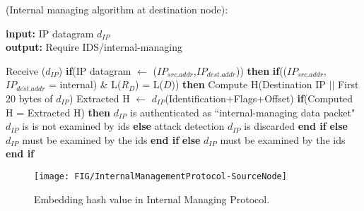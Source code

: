 \documentclass{llncs}
\begin{document}
    \begin{algorithm*}[t]
    \caption{(Internal managing algorithm at destination node):}\label{alg7}
    \hspace*{\algorithmicindent} \textbf{input:}  IP datagram $d_{IP}$ \\
    \hspace*{\algorithmicindent} \textbf{output:}  Require IDS/internal-managing
    \begin{algorithmic}[1]
    \State Receive ($d_{IP}$)
    \State \textbf{if}(IP datagram $\gets$  ($IP_{src.addr}$,$IP_{dest.addr}$)) \textbf{then}
    \State \hspace{10pt} \textbf{if}(($IP_{src.addr}$, $IP_{dest.addr}$ = internal) \& L($R_{D}$) = L($D$)) \textbf{then}
    \State \hspace{20pt} Compute H(Destination IP $||$ First 20 bytes of $d_{IP}$)
    \State \hspace{20pt} Extracted H $\gets$ $d_{IP}$(Identification+Flags+Offset)
    \State \hspace{20pt} \textbf{if}(Computed H = Extracted H) \textbf{then}
    \State \hspace{40pt} $d_{IP}$ is authenticated as ``internal-managing data packet"
    \State \hspace{40pt} $d_{IP}$ is is not examined by \gls*{ids}
    \State \hspace{20pt} \textbf{else}
    \State \hspace{40pt} attack detection
    \State \hspace{40pt} $d_{IP}$ is discarded
    \State \hspace{20pt} \textbf{end if}
    \State \hspace{10pt} \textbf{else}
    \State \hspace{20pt} $d_{IP}$ must be examined by the \gls*{ids}
    \State \hspace{10pt} \textbf{end if}
    \State \textbf{else} 
    \State \hspace{10pt} $d_{IP}$ must be examined by the \gls*{ids}
    \State \textbf{end if}
    \EndProcedure
    \end{algorithmic}
    \end{algorithm*}




\begin{figure*}[t]
\begin{center}
    \texttt{[image: FIG/InternalManagementProtocol-SourceNode]}
\end{center}
\caption{Embedding hash value in Internal Managing Protocol.}
\label{fig5}
\end{figure*}
\end{document}
